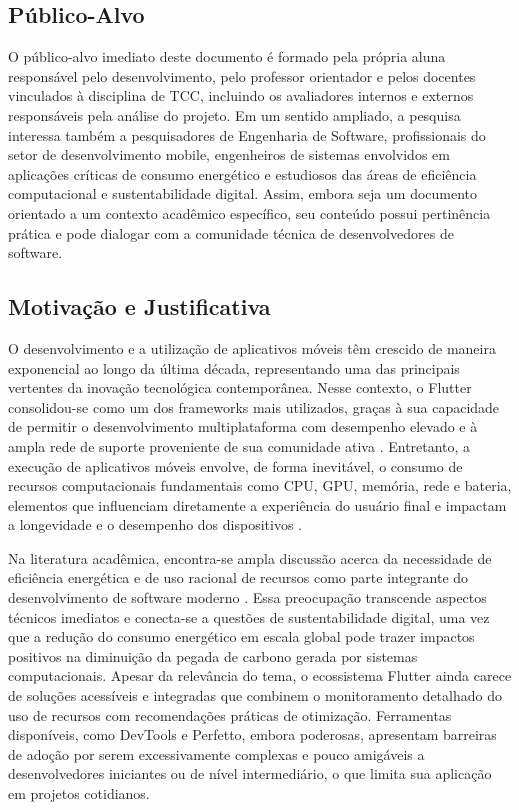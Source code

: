 \documentclass[12pt,a4paper]{article}
\begin{document}
\subsection{Público-Alvo}
O público-alvo imediato deste documento é formado pela própria aluna responsável pelo desenvolvimento, pelo professor orientador e pelos docentes vinculados à disciplina de TCC, incluindo os avaliadores internos e externos responsáveis pela análise do projeto. Em um sentido ampliado, a pesquisa interessa também a pesquisadores de Engenharia de Software, profissionais do setor de desenvolvimento mobile, engenheiros de sistemas envolvidos em aplicações críticas de consumo energético e estudiosos das áreas de eficiência computacional e sustentabilidade digital. Assim, embora seja um documento orientado a um contexto acadêmico específico, seu conteúdo possui pertinência prática e pode dialogar com a comunidade técnica de desenvolvedores de software.

\subsection{Motivação e Justificativa}
O desenvolvimento e a utilização de aplicativos móveis têm crescido de maneira exponencial ao longo da última década, representando uma das principais vertentes da inovação tecnológica contemporânea. Nesse contexto, o Flutter consolidou-se como um dos frameworks mais utilizados, graças à sua capacidade de permitir o desenvolvimento multiplataforma com desempenho elevado e à ampla rede de suporte proveniente de sua comunidade ativa \cite{flutter}. Entretanto, a execução de aplicativos móveis envolve, de forma inevitável, o consumo de recursos computacionais fundamentais como CPU, GPU, memória, rede e bateria, elementos que influenciam diretamente a experiência do usuário final e impactam a longevidade e o desempenho dos dispositivos \cite{energy, monitoring}.  

Na literatura acadêmica, encontra-se ampla discussão acerca da necessidade de eficiência energética e de uso racional de recursos como parte integrante do desenvolvimento de software moderno \cite{mobile_energy, performance}. Essa preocupação transcende aspectos técnicos imediatos e conecta-se a questões de sustentabilidade digital, uma vez que a redução do consumo energético em escala global pode trazer impactos positivos na diminuição da pegada de carbono gerada por sistemas computacionais. Apesar da relevância do tema, o ecossistema Flutter ainda carece de soluções acessíveis e integradas que combinem o monitoramento detalhado do uso de recursos com recomendações práticas de otimização. Ferramentas disponíveis, como DevTools e Perfetto, embora poderosas, apresentam barreiras de adoção por serem excessivamente complexas e pouco amigáveis a desenvolvedores iniciantes ou de nível intermediário, o que limita sua aplicação em projetos cotidianos.  
\end{document}
